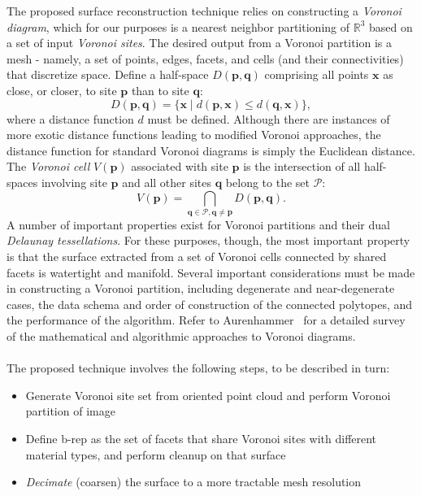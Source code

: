 %
The proposed surface reconstruction technique relies on constructing a \textit{Voronoi diagram}, which for our purposes is a nearest neighbor partitioning of $\mathbb{R}^3$ based on a set of input \textit{Voronoi sites}. The desired output from a Voronoi partition is a mesh - namely, a set of points, edges, facets, and cells (and their connectivities) that discretize space. Define a half-space $D(\bm{p},\bm{q})$ comprising all points $\bm{x}$ as close, or closer, to site $\bm{p}$ than to site $\bm{q}$:
\begin{equation}
D(\bm{p},\bm{q}) = \{\bm{x} \mid d(\bm{p},\bm{x}) \leq d(\bm{q},\bm{x})\},
\end{equation}
where a distance function $d$ must be defined. Although there are instances of more exotic distance functions leading to modified Voronoi approaches, the distance function for standard Voronoi diagrams is simply the Euclidean distance. The \textit{Voronoi cell} $V(\bm{p})$ associated with site $\bm{p}$ is the intersection of all half-spaces involving site $\bm{p}$ and all other sites $\bm{q}$ belong to the set $\mathcal{P}$:
\begin{equation}
V(\bm{p}) = \bigcap \limits_{\bm{q} \in \mathcal{P}, \bm{q} \neq \bm{p}} D(\bm{p},\bm{q}).
\end{equation}
A number of important properties exist for Voronoi partitions and their dual \textit{Delaunay tessellations}. For these purposes, though, the most important property is that the surface extracted from a set of Voronoi cells connected by shared facets is watertight and manifold. Several important considerations must be made in constructing a Voronoi partition, including degenerate and near-degenerate cases, the data schema and order of construction of the connected polytopes, and the
performance of the algorithm. Refer to Aurenhammer~\cite{aurenhammer_1991} for a detailed survey of the mathematical and algorithmic approaches to Voronoi diagrams. \\ \\
%
The proposed technique involves the following steps, to be described in turn:
\begin{itemize}[noitemsep]
\item Generate Voronoi site set from oriented point cloud and perform Voronoi partition of image
\item Define b-rep as the set of facets that share Voronoi sites with different material types, and perform cleanup on that surface
\item \textit{Decimate} (coarsen) the surface to a more tractable mesh resolution
\end{itemize}

